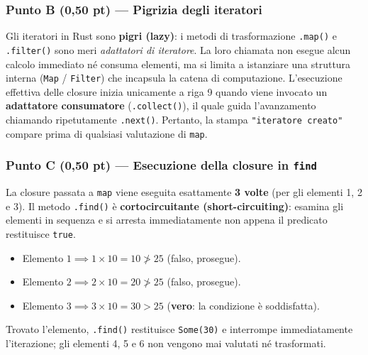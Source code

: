 \documentclass[11pt,a4paper]{article}
\begin{document}
\subsubsection*{Punto B (0,50 pt) --- Pigrizia degli iteratori}
Gli iteratori in Rust sono \textbf{pigri (lazy)}: i metodi di trasformazione \texttt{.map()} e \texttt{.filter()} sono meri \emph{adattatori di iteratore}. La loro chiamata non esegue alcun calcolo immediato né consuma elementi, ma si limita a istanziare una struttura interna (\texttt{Map} / \texttt{Filter}) che incapsula la catena di computazione.
L'esecuzione effettiva delle closure inizia unicamente a riga 9 quando viene invocato un \textbf{adattatore consumatore} (\texttt{.collect()}), il quale guida l'avanzamento chiamando ripetutamente \texttt{.next()}. Pertanto, la stampa \texttt{"iteratore creato"} compare prima di qualsiasi valutazione di \texttt{map}.

\subsubsection*{Punto C (0,50 pt) --- Esecuzione della closure in \texttt{find}}
La closure passata a \texttt{map} viene eseguita esattamente \textbf{3 volte} (per gli elementi 1, 2 e 3).
Il metodo \texttt{.find()} è \textbf{cortocircuitante (short-circuiting)}: esamina gli elementi in sequenza e si arresta immediatamente non appena il predicato restituisce \texttt{true}.
\begin{itemize}[leftmargin=1.5em]
    \item Elemento $1 \implies 1 \times 10 = 10 \not> 25$ (falso, prosegue).
    \item Elemento $2 \implies 2 \times 10 = 20 \not> 25$ (falso, prosegue).
    \item Elemento $3 \implies 3 \times 10 = 30 > 25$ (\textbf{vero}: la condizione è soddisfatta).
\end{itemize}
Trovato l'elemento, \texttt{.find()} restituisce \texttt{Some(30)} e interrompe immediatamente l'iterazione; gli elementi 4, 5 e 6 non vengono mai valutati né trasformati.
\end{document}
